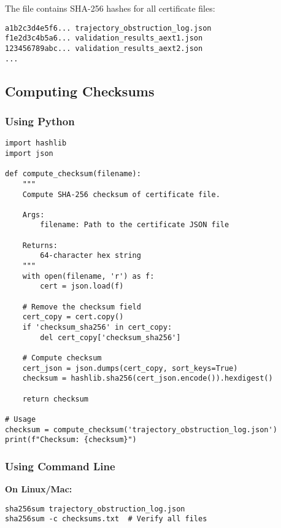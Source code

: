 \documentclass[11pt,a4paper]{article}
\theoremstyle{definition}
\newcommand{\file}[1]{\path{\detokenize{#1}}}
\begin{document}
The \file{checksums.txt} file contains SHA-256 hashes for all certificate files:

\begin{lstlisting}[style=bashstyle, caption={Sample checksums.txt}]
a1b2c3d4e5f6... trajectory_obstruction_log.json
f1e2d3c4b5a6... validation_results_aext1.json
123456789abc... validation_results_aext2.json
...
\end{lstlisting}

\subsection{Computing Checksums}

\subsubsection{Using Python}

\begin{lstlisting}[style=pythonstyle, caption={Computing SHA-256 Checksum in Python}]
import hashlib
import json

def compute_checksum(filename):
    """
    Compute SHA-256 checksum of certificate file.
    
    Args:
        filename: Path to the certificate JSON file
    
    Returns:
        64-character hex string
    """
    with open(filename, 'r') as f:
        cert = json.load(f)
    
    # Remove the checksum field
    cert_copy = cert.copy()
    if 'checksum_sha256' in cert_copy:
        del cert_copy['checksum_sha256']
    
    # Compute checksum
    cert_json = json.dumps(cert_copy, sort_keys=True)
    checksum = hashlib.sha256(cert_json.encode()).hexdigest()
    
    return checksum

# Usage
checksum = compute_checksum('trajectory_obstruction_log.json')
print(f"Checksum: {checksum}")
\end{lstlisting}

\subsubsection{Using Command Line}

\textbf{On Linux/Mac:}
\begin{lstlisting}[style=bashstyle]
sha256sum trajectory_obstruction_log.json
sha256sum -c checksums.txt  # Verify all files
\end{lstlisting}
\end{document}
